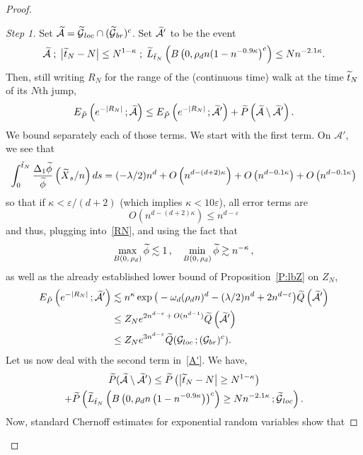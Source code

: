 \documentclass[10pt]{amsart}
\theoremstyle{definition}\newtheorem{defi}[theo]{Definition}\newtheorem{rema}[theo]{Remark}\newtheorem{exam}[theo]{Example}\newtheorem{exem}[theo]{Example}\newtheorem{nota}[theo]{Notation}
\newenvironment{step}[1]{\begin{proof}[#1]}{\let\qed\relax\end{proof}}
\newcommand{\Pmh}{P}
\newcommand*\E {{E}}
\newcommand{\cA}{\mathcal{A}}
\newcommand{\cG}{\mathcal{G}}
\newcommand*\Q{{Q}}
\newcommand*\eps{\varepsilon}
\let\oldtilde\tilde
\renewcommand*{\tilde}[1]{\mathchoice{\widetilde{#1}}{\widetilde{#1}}{\oldtilde{#1}}{\oldtilde{#1}}}\let\oldhat\hat
\renewcommand*{\hat}[1]{\mathchoice{\widehat{#1}}{\widehat{#1}}{\oldhat{#1}}{\oldhat{#1}}}\let\oldexists\exists
\renewcommand*{\exists}{\mathrel{\oldexists}}
\begin{document}
\begin{proof}
\begin{step}{Step 1}
Set $\tilde \cA = \tilde \cG_{loc} \cap (\tilde \cG_{br})^c$. Set $\tilde \cA' $ to be the event
\[
\tilde \cA\; ; \; \left|\tilde t_{N} - N \right| \le N^{1-\kappa} \; ; \; \tilde L_{\tilde t_N} \left(B\left(0,\rho_d n(1- n^{ - 0.9 \kappa}\right)^c\right) \le N n^{-2.1 \kappa}.
\]
Then, still writing $R_N$ for the range of the (continuous time) walk at the time $\tilde t_N$ of its $N$th jump,
\begin{equation}\label{A'}
\E_{\tilde \Pmh}\left(e^{- |R_N|}\,; \tilde \cA\right) \le \E_{\tilde \Pmh}\left(e^{-|R_N|}\,; \tilde \cA'\right) + \tilde \Pmh\left(\tilde \cA \setminus \tilde \cA'\right).
\end{equation}
We bound separately each of those terms. We start with the first term. On $\cA'$, we see that
\[
\int_0^{\tilde t_N} \frac{\Delta_1 \tilde \phi}{\tilde \phi}\left(\tilde X_s/n\right)ds = (- \lambda /2) n^d + O \left(n^{d- (d+2) \kappa}\right) + O \left(n^{d- 0.1\kappa}\right) + O \left(n^{d- 0.1 \kappa}\right)
\]
so that if $\kappa < \eps/(d+2)$ (which implies $\kappa < 10 \eps$), all error terms are
\[
O \left(n^{d- (d+2)\kappa}\right) \le n^{d- \eps}
\]
and thus, plugging into~\eqref{RN}, and using the fact that
\[
\max_{B(0,\,\rho_d)} \tilde \phi \lesssim 1 \,,\quad \min_{B(0,\,\rho_d)} \tilde \phi \gtrsim n^{- \kappa}\,,
\]
as well as the already established lower bound of Proposition~\ref{P:lbZ} on $Z_N $,
\begin{equation}\label{chgmeasA'}
\begin{aligned}
\E_{\tilde \Pmh} \left(e^{- |R_N|}\,; \tilde \cA'\right) &\lesssim n^\kappa\exp\big(- \omega_d (\rho_d n)^d - (\lambda/2) n^d + 2n^{d- \eps} \big) \tilde \Q\left(\tilde \cA'\right)\\
& \le Z_N e^{2n^{d- \eps}\,+\,O(n^{d-1})} \tilde \Q\left(\tilde \cA'\right)\\
& \le Z_N e^{3n^{d- \eps}} \tilde \Q(\cG_{loc}\,; (\cG_{br})^c).
\end{aligned}
\end{equation}
Let us now deal with the second term in~\eqref{A'}. We have,
\begin{multline}\label{decA'}
\tilde \Pmh(\tilde \cA\setminus \tilde \cA') \le \tilde \Pmh\left(\left|\tilde t_N - N\right| \ge N^{1- \kappa}\right)\\
+ \tilde \Pmh \left(\tilde L_{\tilde t_N} \left(B\left(0, \rho_d n\left(1 - n^{- 0.9 \kappa}\right)\right)^c\right) \ge N n^{- 2.1\kappa}\,; \tilde \cG_{loc}\right).
\end{multline}
Now, standard Chernoff estimates for exponential random variables show that

\end{step}
\end{proof}
\end{document}
